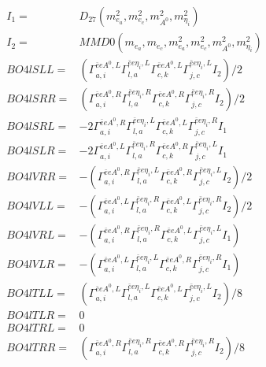 \documentclass[A4,landscape]{article}
\begin{document}
\begin{align} 
I_1 = & D_{27}(m^2_{e_{{a}}}, m^2_{e_{{c}}}, m^2_{A^0}, m^2_{\eta_i}) \\ 
I_2 = & MMD0(m_{e_{{a}}}, m_{e_{{c}}}, m^2_{e_{{a}}}, m^2_{e_{{c}}}, m^2_{A^0}, m^2_{\eta_i}) \\ 
  BO4lSLL= & ( \Gamma^{\bar{e}e A^0 ,L}_{a, i} \Gamma^{\bar{e}e \eta_i ,L}_{l, a} \Gamma^{\bar{e}e A^0 ,L}_{c, k} \Gamma^{\bar{e}e \eta_i ,L}_{j, c} I_2)/2 \\ 
  BO4lSRR= & ( \Gamma^{\bar{e}e A^0 ,R}_{a, i} \Gamma^{\bar{e}e \eta_i ,R}_{l, a} \Gamma^{\bar{e}e A^0 ,R}_{c, k} \Gamma^{\bar{e}e \eta_i ,R}_{j, c} I_2)/2 \\ 
  BO4lSRL= & -2  \Gamma^{\bar{e}e A^0 ,R}_{a, i} \Gamma^{\bar{e}e \eta_i ,L}_{l, a} \Gamma^{\bar{e}e A^0 ,L}_{c, k} \Gamma^{\bar{e}e \eta_i ,R}_{j, c} I_1 \\ 
  BO4lSLR= & -2  \Gamma^{\bar{e}e A^0 ,L}_{a, i} \Gamma^{\bar{e}e \eta_i ,R}_{l, a} \Gamma^{\bar{e}e A^0 ,R}_{c, k} \Gamma^{\bar{e}e \eta_i ,L}_{j, c} I_1 \\ 
  BO4lVRR= & -( \Gamma^{\bar{e}e A^0 ,R}_{a, i} \Gamma^{\bar{e}e \eta_i ,L}_{l, a} \Gamma^{\bar{e}e A^0 ,R}_{c, k} \Gamma^{\bar{e}e \eta_i ,L}_{j, c} I_2)/2 \\ 
  BO4lVLL= & -( \Gamma^{\bar{e}e A^0 ,L}_{a, i} \Gamma^{\bar{e}e \eta_i ,R}_{l, a} \Gamma^{\bar{e}e A^0 ,L}_{c, k} \Gamma^{\bar{e}e \eta_i ,R}_{j, c} I_2)/2 \\ 
  BO4lVRL= & -( \Gamma^{\bar{e}e A^0 ,R}_{a, i} \Gamma^{\bar{e}e \eta_i ,R}_{l, a} \Gamma^{\bar{e}e A^0 ,L}_{c, k} \Gamma^{\bar{e}e \eta_i ,L}_{j, c} I_1) \\ 
  BO4lVLR= & -( \Gamma^{\bar{e}e A^0 ,L}_{a, i} \Gamma^{\bar{e}e \eta_i ,L}_{l, a} \Gamma^{\bar{e}e A^0 ,R}_{c, k} \Gamma^{\bar{e}e \eta_i ,R}_{j, c} I_1) \\ 
  BO4lTLL= & ( \Gamma^{\bar{e}e A^0 ,L}_{a, i} \Gamma^{\bar{e}e \eta_i ,L}_{l, a} \Gamma^{\bar{e}e A^0 ,L}_{c, k} \Gamma^{\bar{e}e \eta_i ,L}_{j, c} I_2)/8 \\ 
  BO4lTLR= & 0 \\ 
  BO4lTRL= & 0 \\ 
  BO4lTRR= & ( \Gamma^{\bar{e}e A^0 ,R}_{a, i} \Gamma^{\bar{e}e \eta_i ,R}_{l, a} \Gamma^{\bar{e}e A^0 ,R}_{c, k} \Gamma^{\bar{e}e \eta_i ,R}_{j, c} I_2)/8 \\ 
\end{align} 
\end{document}
